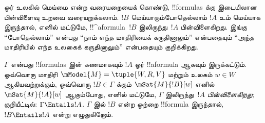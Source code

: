 \documentclass[../../../include/open-logic-section]{subfiles}
\begin{document}


\begin{explain}
  ஓர் உலகில் மெய்மை என்ற வரையறையைக் கொண்டு, !!{formula}s க்கு இடையிலான
  பின்விளைவு உறவை வரையறுக்கலாம். $!B$ மெய்யாகும்போதெல்லாம் $!A$ உம்
  மெய்யாக இருந்தால், எனில் மட்டுமே, !!^a{formula}~$!B$ இலிருந்து~$!A$
  பின்விளைகிறது. இங்கு ``போதெல்லாம்'' என்பது ``நாம் எந்த மாதிரியைக்
  கருதினாலும்'' என்பதையும் ``அந்த மாதிரியில் எந்த உலகைக் கருதினாலும்''
  என்பதையும் குறிக்கிறது.
\end{explain}

\begin{defn}
  $\Gamma$ என்பது !!{formula}s இன் கணமாகவும் $!A$ ஓர் !!a{formula}
  ஆகவும் இருக்கட்டும். ஒவ்வொரு மாதிரி $\mModel{M} = \tuple{W, R, V}$
  மற்றும் உலகம் $w \in W$ ஆகியவற்றுக்கும், ஒவ்வொரு $!B \in \Gamma$
  க்கும் $\mSat{M}{!B}[w]$ எனில் $\mSat{M}{!A}[w]$ ஆகும்போது, எனில்
  மட்டுமே, $\Gamma$ இலிருந்து~$!A$ \emph{பின்விளைகிறது}; குறியீட்டில்:
  $\Gamma \Entails !A$. $\Gamma$ இல் $!B$ என்ற ஒற்றை !!{formula}
  இருந்தால், $!B \Entails !A$ என்று எழுதுகிறோம்.
\end{defn}
\end{document}
